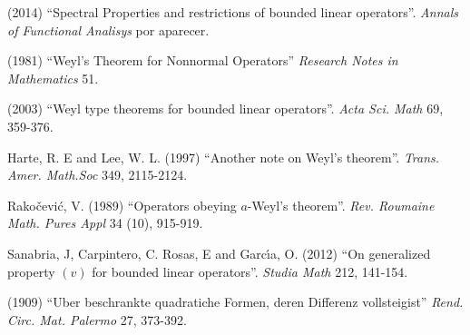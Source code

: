 \begin{titlepage}
\begin{thebibliography}{99}
 (2014) ``Spectral Properties and restrictions of bounded linear operators''. \emph{Annals of Functional Analisys} por aparecer.

 (1981) ``Weyl's Theorem for Nonnormal Operators''
\emph{Research Notes in Mathematics} 51.

 (2003) ``Weyl type theorems for bounded linear operators''.
\emph{Acta Sci. Math} 69, 359-376.

 {\sc Harte, R. E and Lee, W. L.} (1997) ``Another note on Weyl's theorem''. \emph{Trans. Amer. Math.Soc} 349, 2115-2124.

 {\sc Rako\v{c}evi\'{c}, V.} (1989) ``Operators obeying $a$-Weyl's theorem''.
\emph{Rev. Roumaine Math. Pures Appl} 34 (10), 915-919.

 {\sc Sanabria, J, Carpintero, C. Rosas, E and Garc\'{\i}a, O.} (2012) ``On generalized property $(v)$ for bounded linear operators''. \emph{Studia Math} 212, 141-154.

(1909) ``Uber beschrankte quadratiche Formen, deren Differenz vollsteigist''
\emph{Rend. Circ. Mat. Palermo} 27, 373-392.
\end{thebibliography}
\end{titlepage}
